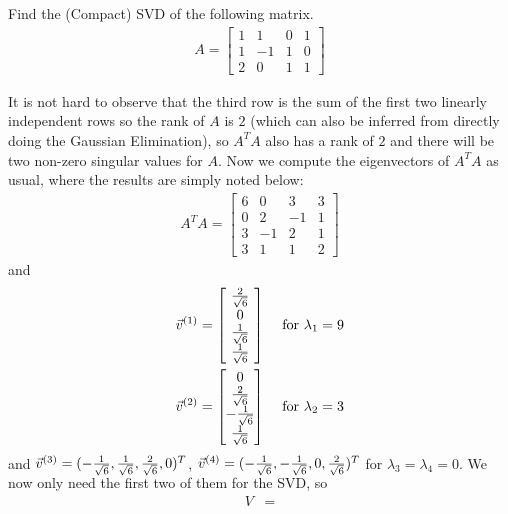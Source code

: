 \begin{exmp}
\label{exmp:compactSVD}
Find the (Compact) SVD of the following matrix.
\begin{align*}
A = 
\begin{bmatrix}
1&1&0&1\\ 
1&-1&1&0\\ 
2&0&1&1
\end{bmatrix}
\end{align*}
\end{exmp}
\begin{solution}
It is not hard to observe that the third row is the sum of the first two linearly independent rows so the rank of $A$ is $2$ (which can also be inferred from directly doing the Gaussian Elimination), so $A^TA$ also has a rank of $2$ and there will be two non-zero singular values for $A$. Now we compute the eigenvectors of $A^T A$ as usual, where the results are simply noted below:
\begin{align*}
A^TA = 
\begin{bmatrix}
6&0&3&3\\ 
0&2&-1&1\\ 
3&-1&2&1\\ 
3&1&1&2
\end{bmatrix}
\end{align*}
and
\begin{align*}
\vec{v}^{(1)} &= 
\left[\begin{array}{wc{10pt}}
\frac{2}{\sqrt{6}} \\
0 \\
\frac{1}{\sqrt{6}} \\
\frac{1}{\sqrt{6}}
\end{array}\right]
& \text{ for } \lambda_1 = 9 \\
\vec{v}^{(2)} &= 
\left[\begin{array}{wc{10pt}}
0 \\
\frac{2}{\sqrt{6}} \\
-\frac{1}{\sqrt{6}} \\
\frac{1}{\sqrt{6}}
\end{array}\right]
& \text{ for } \lambda_2 = 3 \\
\end{align*}
and $\vec{v}^{(3)} = \smash{(-\frac{1}{\sqrt{6}},\frac{1}{\sqrt{6}},\frac{2}{\sqrt{6}},0)^T}$, $\vec{v}^{(4)} = \smash{(-\frac{1}{\sqrt{6}},-\frac{1}{\sqrt{6}},0,\frac{2}{\sqrt{6}})^T}$ for $\lambda_3 = \lambda_4 = 0$. We now only need the first two of them for the SVD, so
\begin{align*}
V &= 

\end{align*}
\end{solution}
